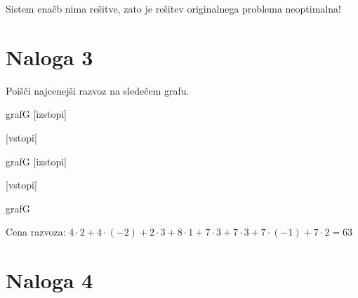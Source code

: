 \documentclass[14pt]{extarticle}
\begin{document}
Sistem enačb nima rešitve, zato je rešitev originalnega problema neoptimalna!

\clearpage

\section*{Naloga 3}

Poišči najcenejši razvoz na sledečem grafu.

\begin{razvoz}[scale=0.9]{grafG}
    [izstopi]


    [vstopi]
\end{razvoz}

\begin{razvoz}[scale=0.9]{grafG}
    [izstopi]


    [vstopi]
\end{razvoz}

\begin{razvoz}[scale=0.9]{grafG}

\end{razvoz}

Cena razvoza: $4 \cdot 2 + 4 \cdot (-2) + 2 \cdot 3 + 8 \cdot 1 + 7 \cdot 3 + 7 \cdot 3 + 7 \cdot (-1) + 7 \cdot 2 = 63$

\clearpage

\section*{Naloga 4}
\end{document}
